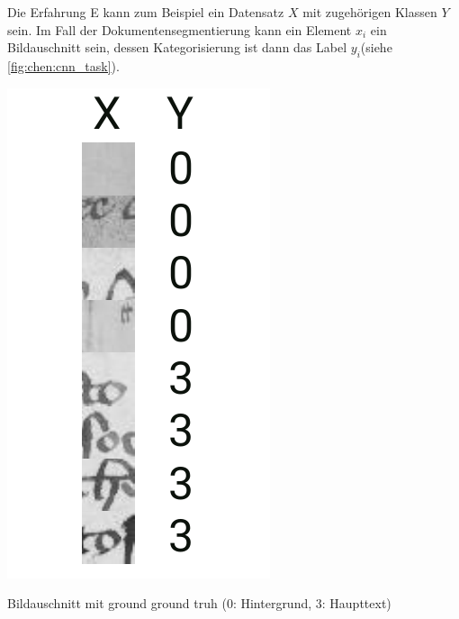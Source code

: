 Die Erfahrung E kann zum Beispiel ein Datensatz \(X\) mit zugehörigen Klassen
\(Y\) sein. Im Fall der Dokumentensegmentierung kann ein Element \(x_i\) ein Bildauschnitt sein, 
dessen Kategorisierung ist dann das Label \(y_i\)(siehe \cref{fig:chen:cnn_task}).
\begin{marginfigure}
    \includegraphics[width=\textwidth]{figures/tasks/chen_examples.pdf}
    \caption{Bildauschnitt mit ground ground truh (0: Hintergrund, 3: Haupttext)}
    \label{fig:chen:cnn_task}
\end{marginfigure}

